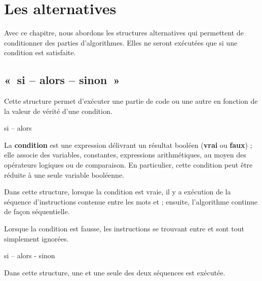 \chapter{Les alternatives}

Avec ce chapitre, nous abordons les structures alternatives qui
permettent de conditionner des parties d'algorithmes.
Elles ne seront exécutées que si une condition est satisfaite.

\section{«~si – alors – sinon~»}

Cette structure permet d'exécuter une partie de code ou
une autre en fonction de la valeur de vérité d'une
condition.

\begin{Emphase}{si – alors}
\end{Emphase}

La \textbf{condition} est une expression délivrant un résultat booléen
(\textbf{vrai} ou \textbf{faux}) ; elle associe des variables,
constantes, expressions arithmétiques, au moyen des opérateurs logiques
ou de comparaison. En particulier, cette condition peut être réduite à
une seule variable booléenne.

Dans cette structure, lorsque la condition est vraie, il y a exécution
de la séquence d’instructions contenue entre les mots
 et  ; ensuite,
l’algorithme continue de façon séquentielle.

Lorsque la condition est fausse, les instructions se trouvant entre
 et  sont tout simplement
ignorées.

\begin{Emphase}{si – alors - sinon}
\end{Emphase}

Dans cette structure, une et une seule des deux séquences est exécutée.

